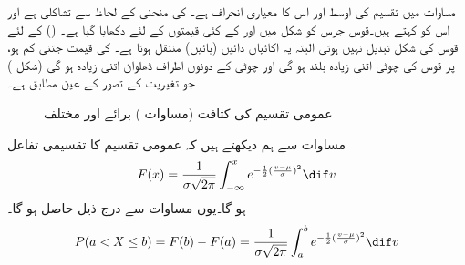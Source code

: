مساوات  میں تقسیم کی اوسط   اور اس کا معیاری انحراف   ہے۔  کی منحنی  کے لحاظ سے تشاکلی ہے اور اس  کو  کہتے ہیں۔قوس جرس کو شکل  میں  اور  کے کئی قیمتوں کے لئے دکھایا گیا ہے۔  () کے لئے قوس کی شکل تبدیل نہیں ہوتی البتہ یہ  اکائیاں دائیں (بائیں) منتقل ہوتا ہے۔ کی قیمت جتنی کم ہو، پر قوس کی چوٹی اتنی زیادہ بلند ہو گی اور چوٹی کے دونوں اطراف ڈھلوان اتنی زیادہ ہو گی (شکل ) جو تغیریت کے تصور کے عین مطابق ہے۔
\begin{figure}
\centering
{}
\caption{عمومی تقسیم  کی کثافت (مساوات ) برائے  اور مختلف }
\label{شکل_شماریات_عمومی_تقسیم}
\end{figure}

مساوات  سے ہم دیکھتے ہیں کہ عمومی تقسیم کا تقسیمی تفاعل
\begin{align}\label{مساوات_شماریات_عمومی_تقسیم_ب}
F(x)=\frac{1}{\sigma\sqrt{2\pi}}\int_{-\infty}^{x}e^{-\frac{1}{2}(\frac{v-\mu}{\sigma})^2}\dif v
\end{align}
ہو گا۔یوں مساوات  سے درج ذیل حاصل ہو گا۔
\begin{align}\label{مساوات_شماریات_عمومی_تقسیم_پ}
P(a<X\le b)=F(b)-F(a)=\frac{1}{\sigma\sqrt{2\pi}}\int_{a}^{b}e^{-\frac{1}{2}(\frac{v-\mu}{\sigma})^2}\dif v
\end{align}

